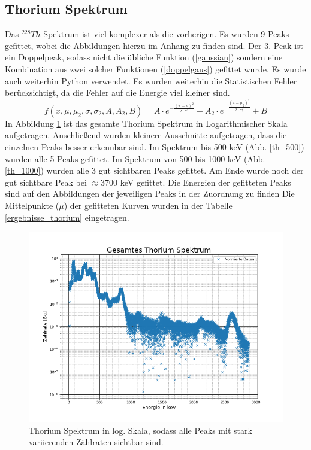 \subsection{Thorium Spektrum}
Das $^{228}Th$ Spektrum ist viel komplexer als die vorherigen. Es wurden 9 Peaks gefittet, wobei die Abbildungen hierzu im Anhang zu finden sind. Der 3. Peak ist ein Doppelpeak, sodass nicht die übliche Funktion (\ref{gaussian}) sondern eine Kombination aus zwei solcher Funktionen (\ref{doppelgaus}) gefittet wurde. Es wurde auch weiterhin Python \cite{SciPy_Opti} verwendet. Es wurden weiterhin die Statistischen Fehler berücksichtigt, da die Fehler auf die Energie viel kleiner sind.
\begin{equation}
	f(x,\mu,\mu_2,\sigma,\sigma_2,A,A_2,B) = 
	 A \cdot e ^{-\frac{(x - \mu) ^ 2}{2 \cdot \sigma ^ 2}} + 
	 A_2 \cdot e ^{-\frac{(x - \mu_2) ^ 2}{2 \cdot \sigma_2 ^ 2}} + 
	 B
	 \label{doppelgaus}
\end{equation}
In Abbildung \ref{thorium} ist das gesamte Thorium Spektrum in Logarithmischer Skala aufgetragen. Anschließend wurden kleinere Ausschnitte aufgetragen, dass die einzelnen Peaks besser erkennbar sind. Im Spektrum bis 500 keV (Abb. \ref{th_500}) wurden alle 5 Peaks gefittet. Im Spektrum von 500 bis 1000 keV (Abb. \ref{th_1000}) wurden alle 3 gut sichtbaren Peaks gefittet. Am Ende wurde noch der gut sichtbare Peak bei $\approx 3700$ keV gefittet. Die Energien der gefitteten Peaks sind auf den Abbildungen der jeweiligen Peaks in der Zuordnung zu finden
Die Mittelpunkte ($\mu$) der gefitteten Kurven wurden in der Tabelle \ref{ergebnisse_thorium} eingetragen. 
\begin{figure}[h]
	\centering
	\includegraphics[scale=0.7]{Bilder/Th_ganz}
	\caption[Gesamtes Thorium Spektrum]{\small Thorium Spektrum in log. Skala, sodass alle Peaks mit stark variierenden Zählraten sichtbar sind.}
	\label{thorium}
\end{figure}

